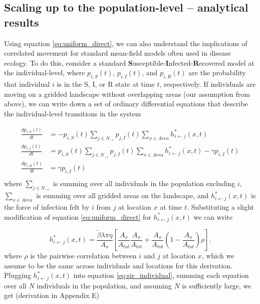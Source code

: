 ﻿\documentclass[11pt]{article}
\begin{document}
\subsection*{Scaling up to the population-level -- analytical results}

Using equation \ref{eq:uniform_direct}, we can also understand the implications of correlated movement for standard mean-field models often used in disease ecology. To do this, consider a standard \textbf{S}usceptible-\textbf{I}nfected-\textbf{R}ecovered model at the individual-level, where $p_{i, S}(t)$, $p_{i, I}(t)$, and $p_{i, R}(t)$ are the probability that individual $i$ is in the S, I, or R state at time $t$, respectively.  If individuals are moving on a gridded landscape without overlapping areas (our assumption from above), we can write down a set of ordinary differential equations that describe the individual-level transitions in the system

\begin{equation}
    \begin{aligned}
        \frac{d p_{i, S}(t)}{dt} &= -p_{i, S}(t) \sum_{j \in N_{-i}} p_{j, I}(t)  \sum_{x \in Area} h_{i \leftarrow j}^*(x, t) \\
        \frac{d p_{i, I}(t)}{dt} &= p_{i, S}(t) \sum_{j \in N_{-i}} p_{j, I}(t)  \sum_{x \in Area} h_{i \leftarrow j}^*(x, t) - \gamma p_{i, I}(t) \\
        \frac{d p_{i, R}(t)}{dt} &= \gamma p_{i, I}(t) \\
    \end{aligned}
    \label{eq:sir_individual}
\end{equation}
where $\sum_{j \in N_{-i}}$ is summing over all individuals in the population excluding $i$, $\sum_{x \in Area}$ is summing over all gridded areas on the landscape, and $h^*_{i \leftarrow j}(x, t)$ is the force of infection felt by $i$ from $j$ at location $x$ at time $t$. Substituting a slight modification of equation \ref{eq:uniform_direct} for $h^*_{i \leftarrow j}(x, t)$ we can write 

$$
h^*_{i \leftarrow j}(x, t) = \frac{\tilde{\beta} \lambda \pi \eta}{A_x} \left[\frac{A_x}{A_{tot}}\frac{A_x}{A_{tot}} + \frac{A_x}{A_{tot}}(1 - \frac{A_x}{A_{tot}}) \rho \right].
$$
where $\rho$ is the pairwise correlation between $i$ and $j$ at location $x$, which we assume to be the same across individuals and locations for this derivation. Plugging $h^*_{i \leftarrow j}(x, t)$ into equation \ref{eq:sir_individual}, summing each equation over all $N$ individuals in the population, and assuming $N$ is sufficiently large, we get (derivation in Appendix E)
\end{document}
